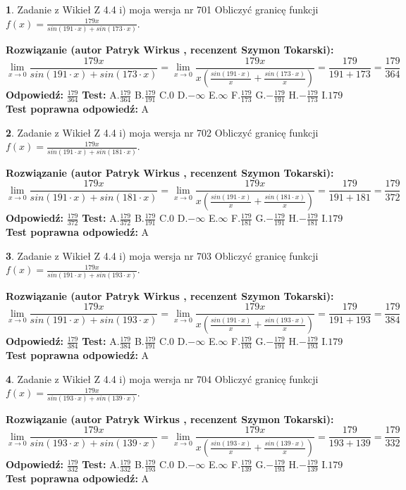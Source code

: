 \documentclass[12pt, a4paper]{article}
\theoremstyle{definition} %
\newtheorem{zad}{}
\newcommand{\zadStart}[1]{\begin{zad}#1\newline}
\newcommand{\zadStop}{\end{zad}}
\newcommand{\rozwStart}[2]{\noindent \textbf{Rozwiązanie (autor #1 , recenzent #2): }\newline}
\newcommand{\rozwStop}{\newline}
\newcommand{\odpStart}{\noindent \textbf{Odpowiedź:}\newline}
\newcommand{\odpStop}{\newline}
\newcommand{\testStart}{\noindent \textbf{Test:}\newline}
\newcommand{\testStop}{\newline}
\newcommand{\kluczStart}{\noindent \textbf{Test poprawna odpowiedź:}\newline}
\newcommand{\kluczStop}{\newline}
\begin{document}
\zadStart{Zadanie z Wikieł Z 4.4 i) moja wersja nr 701}
Obliczyć granicę funkcji $f(x)=\frac{179x}{sin(191\cdot x) +sin(173\cdot x)}$.
\zadStop
\rozwStart{Patryk Wirkus}{Szymon Tokarski}
$$\lim\limits_{x\to 0}\frac{179x}{sin(191\cdot x) +sin(173\cdot x)}=\lim\limits_{x\to 0}\frac{179x}{x(\frac{sin(191\cdot x)}{x}+\frac{sin(173\cdot x)}{x})}=\frac{179}{191+173} = \frac{179}{364}$$
\rozwStop
\odpStart
$\frac{179}{364}$
\odpStop
\testStart
A.$\frac{179}{364}$
B.$\frac{179}{191}$
C.$0$
D.$-\infty$
E.$\infty$
F.$\frac{179}{173}$
G.$-\frac{179}{191}$
H.$-\frac{179}{173}$
I.$179$
\testStop
\kluczStart
A
\kluczStop



\zadStart{Zadanie z Wikieł Z 4.4 i) moja wersja nr 702}
Obliczyć granicę funkcji $f(x)=\frac{179x}{sin(191\cdot x) +sin(181\cdot x)}$.
\zadStop
\rozwStart{Patryk Wirkus}{Szymon Tokarski}
$$\lim\limits_{x\to 0}\frac{179x}{sin(191\cdot x) +sin(181\cdot x)}=\lim\limits_{x\to 0}\frac{179x}{x(\frac{sin(191\cdot x)}{x}+\frac{sin(181\cdot x)}{x})}=\frac{179}{191+181} = \frac{179}{372}$$
\rozwStop
\odpStart
$\frac{179}{372}$
\odpStop
\testStart
A.$\frac{179}{372}$
B.$\frac{179}{191}$
C.$0$
D.$-\infty$
E.$\infty$
F.$\frac{179}{181}$
G.$-\frac{179}{191}$
H.$-\frac{179}{181}$
I.$179$
\testStop
\kluczStart
A
\kluczStop



\zadStart{Zadanie z Wikieł Z 4.4 i) moja wersja nr 703}
Obliczyć granicę funkcji $f(x)=\frac{179x}{sin(191\cdot x) +sin(193\cdot x)}$.
\zadStop
\rozwStart{Patryk Wirkus}{Szymon Tokarski}
$$\lim\limits_{x\to 0}\frac{179x}{sin(191\cdot x) +sin(193\cdot x)}=\lim\limits_{x\to 0}\frac{179x}{x(\frac{sin(191\cdot x)}{x}+\frac{sin(193\cdot x)}{x})}=\frac{179}{191+193} = \frac{179}{384}$$
\rozwStop
\odpStart
$\frac{179}{384}$
\odpStop
\testStart
A.$\frac{179}{384}$
B.$\frac{179}{191}$
C.$0$
D.$-\infty$
E.$\infty$
F.$\frac{179}{193}$
G.$-\frac{179}{191}$
H.$-\frac{179}{193}$
I.$179$
\testStop
\kluczStart
A
\kluczStop



\zadStart{Zadanie z Wikieł Z 4.4 i) moja wersja nr 704}
Obliczyć granicę funkcji $f(x)=\frac{179x}{sin(193\cdot x) +sin(139\cdot x)}$.
\zadStop
\rozwStart{Patryk Wirkus}{Szymon Tokarski}
$$\lim\limits_{x\to 0}\frac{179x}{sin(193\cdot x) +sin(139\cdot x)}=\lim\limits_{x\to 0}\frac{179x}{x(\frac{sin(193\cdot x)}{x}+\frac{sin(139\cdot x)}{x})}=\frac{179}{193+139} = \frac{179}{332}$$
\rozwStop
\odpStart
$\frac{179}{332}$
\odpStop
\testStart
A.$\frac{179}{332}$
B.$\frac{179}{193}$
C.$0$
D.$-\infty$
E.$\infty$
F.$\frac{179}{139}$
G.$-\frac{179}{193}$
H.$-\frac{179}{139}$
I.$179$
\testStop
\kluczStart
A
\kluczStop
\end{document}
